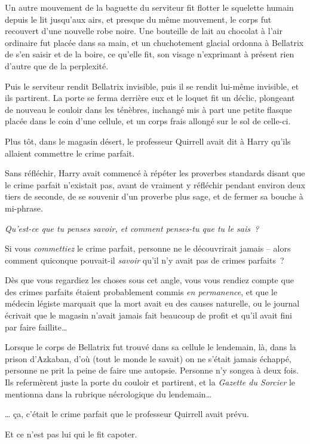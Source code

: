 Un autre mouvement de la baguette du serviteur fit flotter le squelette humain depuis le lit jusqu'aux airs, et presque du même mouvement, le corps fut recouvert d'une nouvelle robe noire. Une bouteille de lait au chocolat à l'air ordinaire fut placée dans sa main, et un chuchotement glacial ordonna à Bellatrix de s'en saisir et de la boire, ce qu'elle fit, son visage n'exprimant à présent rien d'autre que de la perplexité.

Puis le serviteur rendit Bellatrix invisible, puis il se rendit lui-même invisible, et ils partirent. La porte se ferma derrière eux et le loquet fit un déclic, plongeant de nouveau le couloir dans les ténèbres, inchangé mis à part une petite flasque placée dans le coin d'une cellule, et un corps frais allongé sur le sol de celle-ci.

\later

Plus tôt, dans le magasin désert, le professeur Quirrell avait dit à Harry qu'ils allaient commettre le crime parfait.

Sans réfléchir, Harry avait commencé à répéter les proverbes standards disant que le crime parfait n'existait pas, avant de vraiment y réfléchir pendant environ deux tiers de seconde, de se souvenir d'un proverbe plus sage, et de fermer sa bouche à mi-phrase.

\emph{Qu'est-ce que tu penses savoir, et comment penses-tu que tu le sais~?}

Si vous \emph{commettiez} le crime parfait, personne ne le découvrirait jamais -- alors comment quiconque pouvait-il \emph{savoir} qu'il n'y avait pas de crimes parfaits~?

Dès que vous regardiez les choses sous cet angle, vous vous rendiez compte que des crimes parfaits étaient probablement commis \emph{en permanence}, et que le médecin légiste marquait que la mort avait eu des causes naturelle, ou le journal écrivait que le magasin n'avait jamais fait beaucoup de profit et qu'il avait fini par faire faillite…

Lorsque le corps de Bellatrix fut trouvé dans sa cellule le lendemain, là, dans la prison d'Azkaban, d'où (tout le monde le savait) on ne s'était jamais échappé, personne ne prit la peine de faire une autopsie. Personne n'y songea à deux fois. Ils refermèrent juste la porte du couloir et partirent, et la \emph{Gazette du Sorcier} le mentionna dans la rubrique nécrologique du lendemain…

… ça, c'était le crime parfait que le professeur Quirrell avait prévu.

Et ce n'est pas lui qui le fit capoter.
